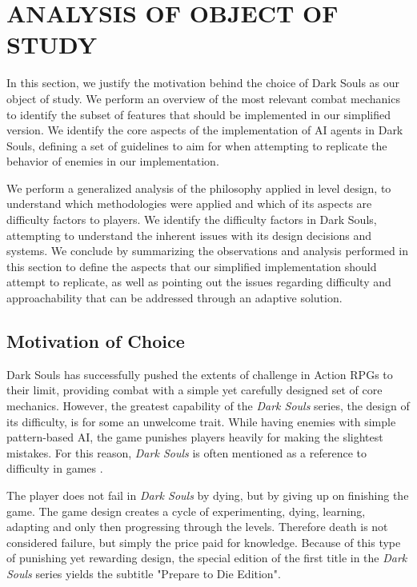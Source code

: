 \chapter{ANALYSIS OF OBJECT OF STUDY}
\label{ch:analysis-object-study}
\label{sec:analysis-dark-souls}

In this section, we justify the motivation behind the choice of Dark Souls as our object of study. We perform an overview of the most relevant combat mechanics to identify the subset of features that should be implemented in our simplified version. We identify the core aspects of the implementation of AI agents in Dark Souls, defining a set of guidelines to aim for when attempting to replicate the behavior of enemies in our implementation.

We perform a generalized analysis of the philosophy applied in level design, to understand which methodologies were applied and which of its aspects are difficulty factors to players. We identify the difficulty factors in Dark Souls, attempting to understand the inherent issues with its design decisions and systems. We conclude by summarizing the observations and analysis performed in this section to define the aspects that our simplified implementation should attempt to replicate, as well as pointing out the issues regarding difficulty and approachability that can be addressed through an adaptive solution.


\section{Motivation of Choice}

Dark Souls has successfully pushed the extents of challenge in Action RPGs to their limit, providing combat with a simple yet carefully designed set of core mechanics. However, the greatest capability of the \emph{Dark Souls} series, the design of its difficulty, is for some an unwelcome trait. While having enemies with simple pattern-based AI, the game punishes players heavily for making the slightest mistakes. For this reason, \emph{Dark Souls} is often mentioned as a reference to difficulty in games \cite{URL_ExploringDesignOfDarkSouls}.

The player does not fail in \emph{Dark Souls} by dying, but by giving up on finishing the game. The game design creates a cycle of experimenting, dying, learning, adapting and only then progressing through the levels. Therefore death is not considered failure, but simply the price paid for knowledge. Because of this type of punishing yet rewarding design, the special edition of the first title in the \emph{Dark Souls} series yields the subtitle "Prepare to Die Edition".

